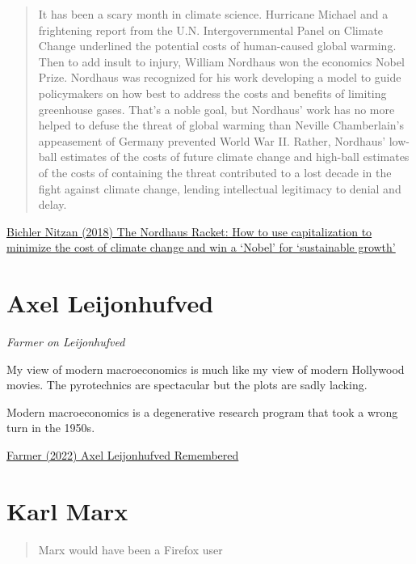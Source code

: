 \documentclass[
]{book}
\begin{document}
\begin{quote}
It has been a scary month in climate science. Hurricane Michael and a frightening report from the U.N. Intergovernmental Panel on Climate Change underlined the potential costs of human-caused global warming. Then to add insult to injury, William Nordhaus won the economics Nobel Prize.
Nordhaus was recognized for his work developing a model to guide policymakers on how best to address the costs and benefits of limiting greenhouse gases. That's a noble goal, but Nordhaus' work has no more helped to defuse the threat of global warming than Neville Chamberlain's appeasement of Germany prevented World War II. Rather, Nordhaus' low-ball estimates of the costs of future climate change and high-ball estimates of the costs of containing the threat contributed to a lost decade in the fight against climate change, lending intellectual legitimacy to denial and delay.
\end{quote}

\href{https://rwer.wordpress.com/2018/11/05/the-nordhaus-racket-how-to-use-capitalization-to-minimize-the-cost-of-climate-change-and-win-a-nobel-for-sustainable-growth/}{Bichler Nitzan (2018) The Nordhaus Racket: How to use capitalization to minimize the cost of climate change and win a `Nobel' for `sustainable growth'}

\hypertarget{axel-leijonhufved}{%
\section{Axel Leijonhufved}\label{axel-leijonhufved}}

\emph{Farmer on Leijonhufved}

My view of modern macroeconomics is much like my view of modern Hollywood movies. The pyrotechnics are spectacular but the plots are sadly lacking.

Modern macroeconomics is a degenerative research program that took a wrong turn in the 1950s.

\href{https://www.rogerfarmer.com/rogerfarmerblog/2022/5/7/axel-leijonhufvud-september-6th-1933-may-2nd-2022}{Farmer (2022) Axel Leijonhufved Remembered}

\hypertarget{karl-marx}{%
\section{Karl Marx}\label{karl-marx}}

\begin{quote}
Marx would have been a Firefox user
\end{quote}
\end{document}
